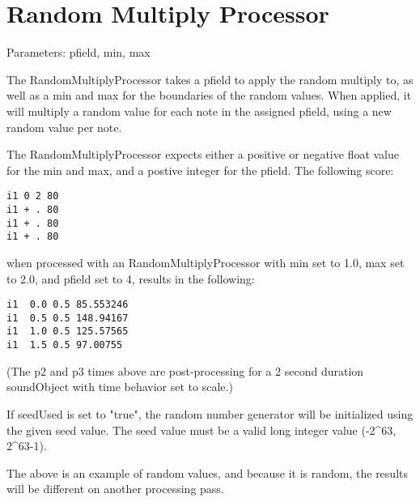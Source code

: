 \section{Random Multiply Processor}\label{randomMultiplyProcessor}

Parameters: pfield, min, max

The RandomMultiplyProcessor takes a pfield to apply the random multiply
to, as well as a min and max for the boundaries of the random values.
When applied, it will multiply a random value for each note in the
assigned pfield, using a new random value per note.

The RandomMultiplyProcessor expects either a positive or negative float
value for the min and max, and a postive integer for the pfield. The
following score:

\begin{verbatim}
i1 0 2 80
i1 + . 80
i1 + . 80
i1 + . 80
\end{verbatim}

when processed with an RandomMultiplyProcessor with min set to 1.0, max
set to 2.0, and pfield set to 4, results in the following:

\begin{verbatim}
i1  0.0 0.5 85.553246
i1  0.5 0.5 148.94167
i1  1.0 0.5 125.57565
i1  1.5 0.5 97.00755
\end{verbatim}

(The p2 and p3 times above are post-processing for a 2 second duration
soundObject with time behavior set to scale.)

If seedUsed is set to "true", the random number generator will be
initialized using the given seed value. The seed value must be a valid
long integer value (-2\^{}63, 2\^{}63-1).

The above is an example of random values, and because it is random, the
results will be different on another processing pass.
